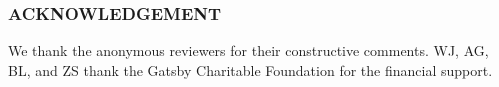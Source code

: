 \documentclass[english]{article}
\theoremstyle{plain}
\theoremstyle{plain}
\begin{document}




\subsubsection*{ACKNOWLEDGEMENT}
We thank the anonymous reviewers for their constructive comments. 
WJ, AG, BL, and ZS thank the Gatsby Charitable Foundation for the financial
support.

\newpage



\clearpage
\newpage
\onecolumn
\appendix

\end{document}
